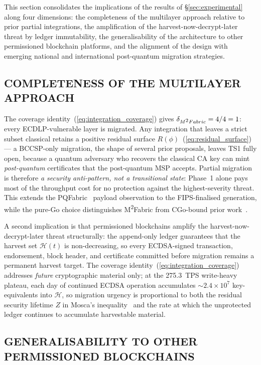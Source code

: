 \documentclass{ieeetj}
\newcommand{\mfabric}{M\textsuperscript{2}Fabric}
\begin{document}
This section consolidates the implications of the results of
\S\ref{sec:experimental} along four dimensions: the completeness of
the multilayer approach relative to prior partial integrations, the
amplification of the harvest-now-decrypt-later threat by ledger
immutability, the generalisability of the architecture to other permissioned
blockchain platforms, and the alignment of the design with emerging national
and international post-quantum migration strategies.

\subsection{COMPLETENESS OF THE MULTILAYER APPROACH}
\label{sec:disc_completeness}

The coverage identity~(\ref{eq:integration_coverage}) gives
$\delta_{\mfabric{}}=4/4=1$: every ECDLP-vulnerable layer is migrated.
Any integration that leaves a strict subset classical retains a positive
residual surface $R(\phi)$~(\ref{eq:residual_surface}) --- a BCCSP-only
migration, the shape of several prior proposals, leaves TS1 fully open,
because a quantum adversary who recovers the classical CA key can mint
\emph{post-quantum} certificates that the post-quantum MSP accepts.
Partial migration is therefore \emph{a security anti-pattern, not a
transitional state}: Phase~1 alone pays most of the throughput cost for
no protection against the highest-severity threat. This extends the
PQFabric~\cite{holcomb2021} payload observation to the FIPS-finalised
generation, while the pure-Go choice distinguishes \mfabric{} from
CGo-bound prior work~\cite{stebila2016oqs}.

A second implication is that permissioned blockchains amplify the
harvest-now-decrypt-later threat structurally: the append-only ledger
guarantees that the harvest set $\mathcal{H}(t)$ is non-decreasing, so
every ECDSA-signed transaction, endorsement, block header, and
certificate committed before migration remains a permanent harvest
target. The coverage identity~(\ref{eq:integration_coverage}) addresses
\emph{future} cryptographic material only; at the 275.3~TPS write-heavy
plateau, each day of continued ECDSA operation accumulates
$\sim 2.4\times 10^{7}$ key-equivalents into $\mathcal{H}$, so migration
urgency is proportional to both the residual security lifetime $Z$ in
Mosca's inequality~\cite{mosca2018} and the rate at which the unprotected
ledger continues to accumulate harvestable material.

\subsection{GENERALISABILITY TO OTHER PERMISSIONED BLOCKCHAINS}
\label{sec:disc_general}
\end{document}
